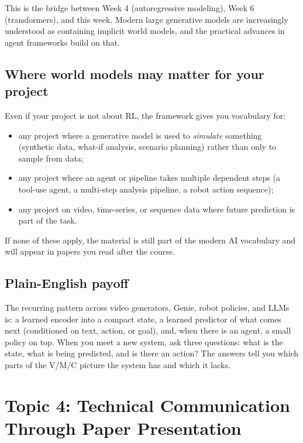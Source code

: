 \documentclass[11pt]{article}
\theoremstyle{remark}
\begin{document}
This is the bridge between Week 4 (autoregressive modeling), Week 6 (transformers), and this week. Modern large generative models are increasingly understood as containing implicit world models, and the practical advances in agent frameworks build on that.

\subsection{Where world models may matter for your project}

Even if your project is not about RL, the framework gives you vocabulary for:
\begin{itemize}[leftmargin=1.4em]
  \item any project where a generative model is used to \emph{simulate} something (synthetic data, what-if analysis, scenario planning) rather than only to sample from data;
  \item any project where an agent or pipeline takes multiple dependent steps (a tool-use agent, a multi-step analysis pipeline, a robot action sequence);
  \item any project on video, time-series, or sequence data where future prediction is part of the task.
\end{itemize}
If none of these apply, the material is still part of the modern AI vocabulary and will appear in papers you read after the course.

\subsection*{Plain-English payoff}

The recurring pattern across video generators, Genie, robot policies, and LLMs is: a learned encoder into a compact state, a learned predictor of what comes next (conditioned on text, action, or goal), and, when there is an agent, a small policy on top. When you meet a new system, ask three questions: what is the state, what is being predicted, and is there an action? The answers tell you which parts of the V/M/C picture the system has and which it lacks.

\section{Topic 4: Technical Communication Through Paper Presentation}
\end{document}
